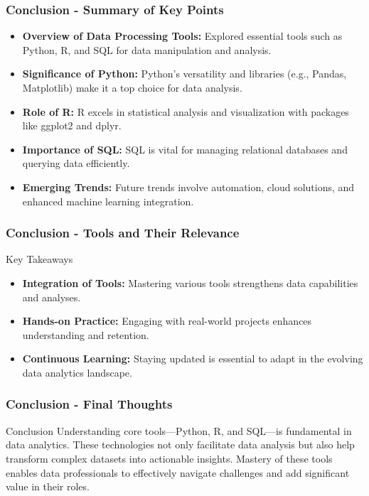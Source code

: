 \documentclass[aspectratio=169]{beamer}
\begin{document}
\begin{frame}[fragile]
    \frametitle{Conclusion - Summary of Key Points}
    \begin{itemize}
        \item \textbf{Overview of Data Processing Tools:} 
        Explored essential tools such as Python, R, and SQL for data manipulation and analysis.
        
        \item \textbf{Significance of Python:} 
        Python’s versatility and libraries (e.g., Pandas, Matplotlib) make it a top choice for data analysis.
        
        \item \textbf{Role of R:} 
        R excels in statistical analysis and visualization with packages like ggplot2 and dplyr.
        
        \item \textbf{Importance of SQL:} 
        SQL is vital for managing relational databases and querying data efficiently.
        
        \item \textbf{Emerging Trends:} 
        Future trends involve automation, cloud solutions, and enhanced machine learning integration.
    \end{itemize}
\end{frame}

\begin{frame}[fragile]
    \frametitle{Conclusion - Tools and Their Relevance}
    \begin{block}{Key Takeaways}
        \begin{itemize}
            \item \textbf{Integration of Tools:} 
            Mastering various tools strengthens data capabilities and analyses.
          
            \item \textbf{Hands-on Practice:} 
            Engaging with real-world projects enhances understanding and retention.
            
            \item \textbf{Continuous Learning:} 
            Staying updated is essential to adapt in the evolving data analytics landscape.
        \end{itemize}
    \end{block}
\end{frame}

\begin{frame}[fragile]
    \frametitle{Conclusion - Final Thoughts}
    \begin{block}{Conclusion}
        Understanding core tools—Python, R, and SQL—is fundamental in data analytics. 
        These technologies not only facilitate data analysis but also help transform complex datasets into actionable insights. 
        Mastery of these tools enables data professionals to effectively navigate challenges and add significant value in their roles.
    \end{block}
\end{frame}
\end{document}
